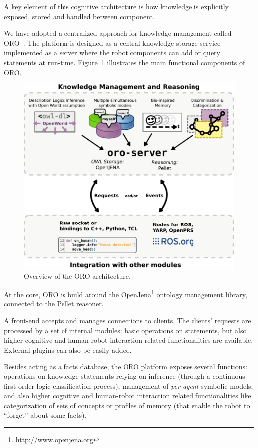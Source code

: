 \documentclass{svmult}
\begin{document}
A key element of this cognitive architecture is how knowledge is explicitly
exposed, stored and handled between component.

We have adopted a centralized approach for knowledge management called
ORO~\cite{Lemaignan2010}. The platform is designed as a central
knowledge storage service implemented as a server where the robot
components can add or query statements at run-time. Figure~\ref{fig|oro-overview}
illustrates the main functional components of ORO.

\begin{figure}[!t]
\centering
  \includegraphics[width=0.8\linewidth]{figs/oro_architecture_functional.pdf}
  \caption{Overview of the ORO architecture.}
  \label{fig|oro-overview}
\end{figure}

At the core, ORO is build around the
OpenJena\footnote{\url{http://www.openjena.org}} ontology management library,
connected to the Pellet reasoner.

A front-end accepts and manages connections to clients. The clients' requests
are processed by a set of internal modules: basic operations on statements, but
also higher cognitive and human-robot interaction related functionalities are
available. External plugins can also be easily added.

Besides acting as a facts database, the ORO platform exposes several functions:
operations on knowledge statements relying on inference (through a continuous
first-order logic classification process), management of \emph{per-agent}
symbolic models, and also higher cognitive and human-robot interaction related
functionalities like categorization of sets of concepts or profiles of memory
(that enable the robot to ``forget'' about some facts).
\end{document}

